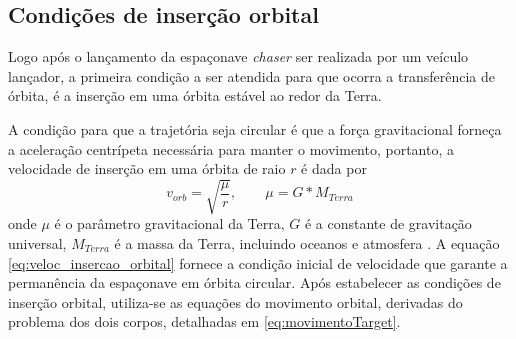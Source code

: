\subsection{Condições de inserção orbital}
Logo após o lançamento da espaçonave \emph{chaser} ser realizada por um veículo lançador,
a primeira condição a ser atendida para que ocorra a transferência de órbita, é a inserção em uma órbita estável ao redor da Terra.

A condição para que a trajetória seja circular é que a força gravitacional forneça a aceleração centrípeta necessária para manter o movimento, portanto, a velocidade de inserção em uma órbita de raio $r$ é dada por
\begin{equation}
    \label{eq:veloc_insercao_orbital}
v_{orb} = \sqrt{\frac{\mu}{r}},
\qquad
\mu = G * M_{Terra}
\end{equation}
onde $\mu$ é o parâmetro gravitacional da Terra, $G$ é a constante de gravitação universal, $M_{Terra}$ é a massa da Terra, incluindo oceanos e atmosfera \cite{IC2021}. 
A equação \eqref{eq:veloc_insercao_orbital} fornece a condição inicial de velocidade que garante a permanência da espaçonave em órbita circular. 
Após estabelecer as condições de inserção orbital, utiliza-se as equações do movimento orbital, derivadas do problema dos dois corpos, detalhadas em \eqref{eq:movimentoTarget}.